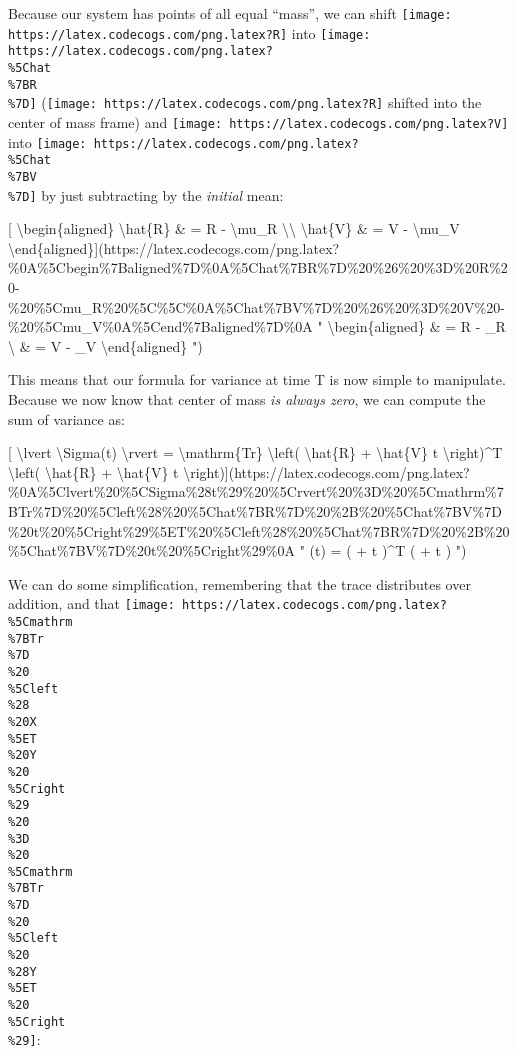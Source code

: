\documentclass[]{article}
\begin{document}
Because our system has points of all equal ``mass'', we can shift
\texttt{[image: https://latex.codecogs.com/png.latex?R]} into
\texttt{[image: https://latex.codecogs.com/png.latex?\\\%5Chat\\\%7BR\\\%7D]}
(\texttt{[image: https://latex.codecogs.com/png.latex?R]} shifted into the
center of mass frame) and
\texttt{[image: https://latex.codecogs.com/png.latex?V]} into
\texttt{[image: https://latex.codecogs.com/png.latex?\\\%5Chat\\\%7BV\\\%7D]} by just
subtracting by the \emph{initial} mean:

{[} \textbackslash{}begin\{aligned\} \textbackslash{}hat\{R\} \& = R -
\textbackslash{}mu\_R \textbackslash{}\textbackslash{} \textbackslash{}hat\{V\}
\& = V - \textbackslash{}mu\_V
\textbackslash{}end\{aligned\}{]}(https://latex.codecogs.com/png.latex?\%0A\%5Cbegin\%7Baligned\%7D\%0A\%5Chat\%7BR\%7D\%20\%26\%20\%3D\%20R\%20-\%20\%5Cmu\_R\%20\%5C\%5C\%0A\%5Chat\%7BV\%7D\%20\%26\%20\%3D\%20V\%20-\%20\%5Cmu\_V\%0A\%5Cend\%7Baligned\%7D\%0A
" \textbackslash{}begin\{aligned\}  \& = R - \mu\_R \textbackslash{}
 \& = V - \mu\_V \textbackslash{}end\{aligned\} ")

This means that our formula for variance at time T is now simple to manipulate.
Because we now know that center of mass \emph{is always zero}, we can compute
the sum of variance as:

{[} \textbackslash{}lvert \textbackslash{}Sigma(t) \textbackslash{}rvert =
\textbackslash{}mathrm\{Tr\} \textbackslash{}left( \textbackslash{}hat\{R\} +
\textbackslash{}hat\{V\} t \textbackslash{}right)\^{}T \textbackslash{}left(
\textbackslash{}hat\{R\} + \textbackslash{}hat\{V\} t
\textbackslash{}right){]}(https://latex.codecogs.com/png.latex?\%0A\%5Clvert\%20\%5CSigma\%28t\%29\%20\%5Crvert\%20\%3D\%20\%5Cmathrm\%7BTr\%7D\%20\%5Cleft\%28\%20\%5Chat\%7BR\%7D\%20\%2B\%20\%5Chat\%7BV\%7D\%20t\%20\%5Cright\%29\%5ET\%20\%5Cleft\%28\%20\%5Chat\%7BR\%7D\%20\%2B\%20\%5Chat\%7BV\%7D\%20t\%20\%5Cright\%29\%0A
" \lvert \Sigma(t) \rvert =  \left(  +  t \right)\^{}T
\left(  +  t \right) ")

We can do some simplification, remembering that the trace distributes over
addition, and that
\texttt{[image: https://latex.codecogs.com/png.latex?\\\%5Cmathrm\\\%7BTr\\\%7D\\\%20\\\%5Cleft\\\%28\\\%20X\\\%5ET\\\%20Y\\\%20\\\%5Cright\\\%29\\\%20\\\%3D\\\%20\\\%5Cmathrm\\\%7BTr\\\%7D\\\%20\\\%5Cleft\\\%20\\\%28Y\\\%5ET\\\%20\\\%5Cright\\\%29]}:
\end{document}
